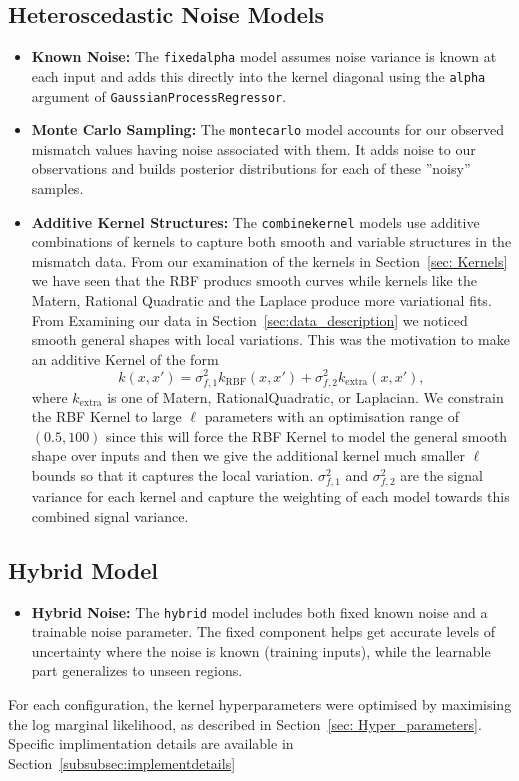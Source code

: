 \documentclass{ucdgradtaughtthesis}
\begin{document}
\subsection{Heteroscedastic Noise Models}
\begin{itemize}
    \item \textbf{Known Noise:} The \texttt{fixedalpha} model assumes noise variance is known at each input and adds this directly into the kernel diagonal using the \texttt{alpha} argument of \texttt{GaussianProcessRegressor}.
    \item \textbf{Monte Carlo Sampling:} The \texttt{montecarlo} model accounts for our observed mismatch values having noise associated with them. It adds noise to our observations and builds posterior distributions for each of these ''noisy'' samples. 
    \item \textbf{Additive Kernel Structures:} The \texttt{combinekernel} models use additive combinations of kernels to capture both smooth and variable structures in the mismatch data. From our examination of the kernels in Section~\ref{sec: Kernels} we have seen that the RBF producs smooth curves while kernels like the Matern, Rational Quadratic and the Laplace produce more variational fits.
            From Examining our data in Section~\ref{sec:data_description} we noticed smooth general shapes with local variations. This was the motivation to make an additive Kernel of the form 
    \begin{equation}
        k(x, x') = \sigma_{f,1}^2k_{\mathrm{RBF}}(x, x') + \sigma_{f,2}^2k_{\mathrm{extra}}(x, x'),
    \end{equation}
    where \(k_{\mathrm{extra}}\) is one of Matern, RationalQuadratic, or Laplacian. We constrain the RBF Kernel to large \(\ell\) parameters with an optimisation range of \((0.5,100)\) since this will force the RBF Kernel to model the general smooth shape over inputs
    and then we give the additional kernel much smaller \(\ell\) bounds so that it captures the local variation. \(\sigma_{f,1}^2\) and \(\sigma_{f,2}^2\) are the signal variance for each kernel and capture the weighting of each model towards this combined signal variance.
\end{itemize}
%
%

\noindent
\subsection{Hybrid Model}
\begin{itemize}
    \item \textbf{Hybrid Noise:} The \texttt{hybrid} model includes both fixed known noise and a trainable noise parameter. The fixed component helps get accurate levels of uncertainty where the noise is known (training inputs), while the learnable part generalizes to unseen regions.
\end{itemize}
%
For each configuration, the kernel hyperparameters were optimised by maximising the log marginal likelihood, as described in Section~\ref{sec: Hyper_parameters}. 
Specific implimentation details are available in Section~\ref{subsubsec:implementdetails}
%
%
%
\end{document}
